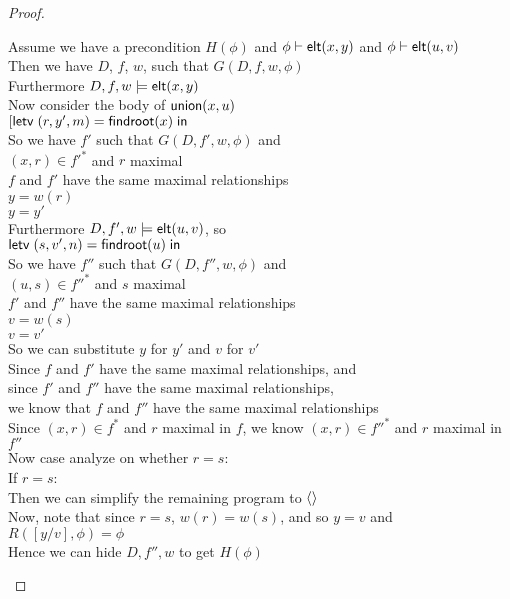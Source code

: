 \begin{proof}
\begin{tabbedproof}
\oo Assume we have a precondition $H(\phi)$ and ${\phi} \vdash \mathsf{elt}({x}, {y})$ and ${\phi} \vdash \mathsf{elt}({u}, {v})$\\
\ooo Then we have $D$, $f$, $w$, such that $G(D, f, w, \phi)$ \\
\ooo Furthermore $D, f, w \models \mathsf{elt}({x}, {y})$ \\
\ooo Now consider the body of $\mathsf{union}(x,u)$ \\
\ooo $[\mathsf{letv}\;(r,y',m) = \mathsf{findroot}(x)\;\mathsf{in}\;$ \\
\ooo So we have $f'$ such that $G(D, f', w, \phi)$ and \\
\ooox  $(x, r) \in f'^*$ and $r$ maximal \\
\ooox  $f$ and $f'$ have the same maximal relationships \\
\ooox  $y = w(r)$ \\
\ooox  $y = y'$ \\
\ooo Furthermore $D, f', w \models \mathsf{elt}({u}, {v})$, so \\
\ooo $\mathsf{letv}\;(s,v',n) = \mathsf{findroot}(u)\;\mathsf{in}\;$ \\
\ooo So we have $f''$ such that $G(D, f'', w, \phi)$ and \\
\ooox  $(u, s) \in f''^*$ and $s$ maximal \\
\ooox  $f'$ and $f''$ have the same maximal relationships \\
\ooox  $v = w(s)$ \\
\ooox  $v = v'$ \\
\ooo So we can substitute $y$ for $y'$ and $v$ for $v'$ \\
\ooo Since $f$ and $f'$ have the same maximal relationships, and \\
\oox since $f'$ and $f''$ have the same maximal relationships,  \\
\oox we know that $f$ and $f''$ have the same maximal relationships \\
\ooo Since $(x,r) \in f^*$ and $r$ maximal in $f$, we know $(x, r) \in f''^*$ and $r$ maximal in $f''$ \\
\ooo Now case analyze on whether $r = s$: \\
\ooo If $r = s$: \\
\oooo Then we can simplify the remaining program to $\left<\right>$ \\
\oooo Now, note that since $r = s$, $w(r) = w(s)$, and so $y = v$ and $R([y/v], \phi) = \phi$ \\
\oooo Hence we can hide $D, f'', w$ to get $H(\phi)$ \\

\end{tabbedproof}
\end{proof}
